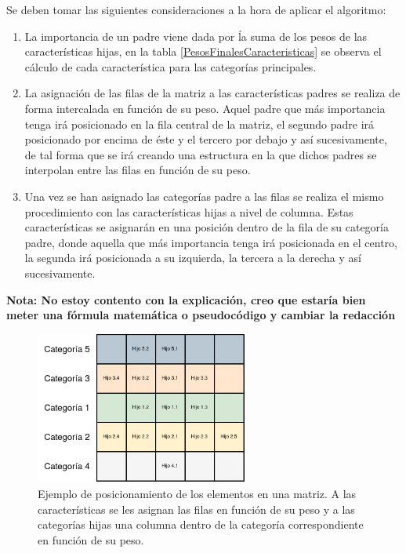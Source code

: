        Se deben tomar las siguientes consideraciones a la hora de aplicar el algoritmo:

        \begin{enumerate}

            \item La importancia de un padre viene dada por ĺa suma de los pesos de las características hijas, en la tabla \ref{PesosFinalesCaracteristicas} se observa el cálculo de cada característica para las categorías principales.

            \item La asignación de las filas de la matriz a las características padres se realiza de forma intercalada en función de su peso. Aquel padre que más importancia tenga irá posicionado en la fila central de la matriz, el segundo padre irá posicionado por encima de éste y el tercero por debajo y así sucesivamente, de tal forma que se irá creando una estructura en la que dichos padres se interpolan entre las filas en función de su peso.

            \item Una vez se han asignado las categorías padre a las filas se realiza el mismo procedimiento con las características hijas a nivel de columna. Estas características se asignarán en una posición dentro de la fila de su categoría padre, donde aquella que más importancia tenga irá posicionada en el centro, la segunda irá posicionada a su izquierda, la tercera a la derecha y así sucesivamente.
        \end{enumerate}

        \textbf{Nota: No estoy contento con la explicación, creo que estaría bien meter una fórmula matemática o pseudocódigo y cambiar la redacción}


        \begin{figure}[H]
            \centering
            \includegraphics[width=7cm]{archivos/4.Metodologia/Matrices/FV2I}
            \caption{Ejemplo de posicionamiento de los elementos en una matriz. A las características se les asignan las filas en función de su peso y a las categorías hijas una columna dentro de la categoría correspondiente en función de su peso.}
            \label{FV2IExampleImage}
        \end{figure}

